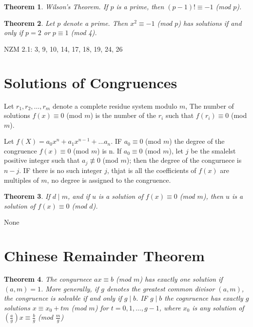 \documentclass[11pt]{article} %
\newtheorem{theorem}{Theorem}[section]
\newenvironment{definition}[1][Definition]{\begin{trivlist}
\item[\hskip \labelsep {\bfseries #1}]}{\end{trivlist}}
\newenvironment{assignment}[1][Assignment]{\begin{trivlist}
\item[\hskip \labelsep {\bfseries #1}]}{\end{trivlist}}
\begin{document}
\begin{theorem}
	Wilson's Theorem. If $p$ is a prime, then $(p - 1)! \equiv -1$ (mod $p$). 
\end{theorem}

\begin{theorem}
	Let $p$ denote a prime. Then $x^2 \equiv -1$ (mod $p$) has solutions if and only if $p = 2$ or $p \equiv 1$ (mod 4). 
\end{theorem}

\begin{assignment}
	NZM 2.1: 3, 9, 10, 14, 17, 18, 19, 24, 26
\end{assignment}

\section{Solutions of Congruences}

\begin{definition}
	Let $r_1, r_2, \ldots, r_m$ denote a complete residue system modulo $m$, The number of solutions $f(x) \equiv 0$ (mod $m$) is the number of the $r_i$ such that $f(r_i) \equiv 0$ (mod $m$).
\end{definition}

\begin{definition}
	Let $f(X) = a_0x^n + a_1x^{n-1} + \ldots a_n$. IF $a_0 \equiv 0$ (mod $m$) the degree of the congruence $f(x) \equiv 0$ (mod $m$) is n. If $a_0 \equiv 0$ (mod $m$), let $j$ be the smalelst positive integer such that $a_j \not\equiv 0$ (mod $m$); then the degree of the congurnece is $n - j$. IF there is no such integer $j$, thjat is all the coefficients of $f(x)$ are multiples of $m$, no degree is assigned to the congruence. 
\end{definition}

\begin{theorem}
	If $d \mid m$, and if $u$ is a solution of $f(x) \equiv 0$ (mod $m$), then $u$ is a solution of $f(x) \equiv 0$ (mod $d$). 
\end{theorem}

\begin{assignment}
	None
\end{assignment}

\section{Chinese Remainder Theorem}

\begin{theorem}
	The congurnece $ax \equiv b$ (mod $m$) has exactly one solution if $(a, m) = 1$. More generally, if $g$ denotes the greatest common divisor $(a, m)$, the congruence is solvable if and only if $g \mid b$. IF $g \mid b$ the cognruence has exactly $g$ solutions $x \equiv x_0 + tm$ (mod $m$) for $t = 0, 1, \ldots, g - 1$, where $x_0$ is any solution of $(\frac{a}{g})x \equiv \frac{b}{g}$ (mod $\frac{m}{g}$)
\end{theorem}
\end{document}
